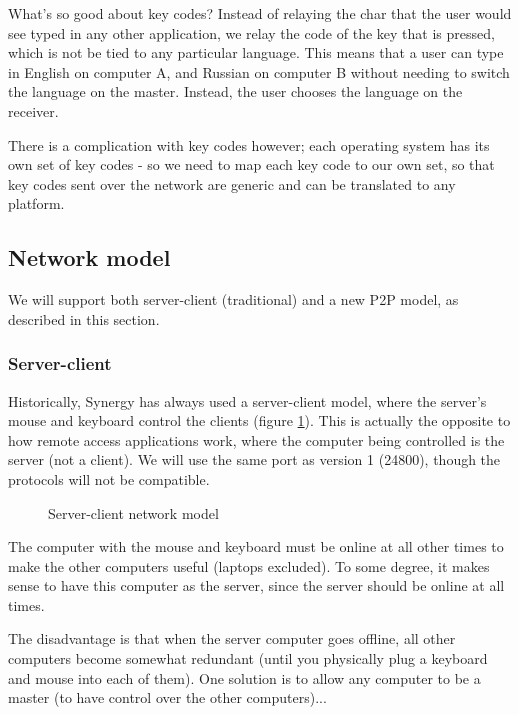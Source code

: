 What's so good about key codes? Instead of relaying the char that the user would
see typed in any other application, we relay the code of the key that is 
pressed, which is not be tied to any particular language. This means that a user
can type in English on computer A, and Russian on computer B without needing to
switch the language on the master. Instead, the user chooses the language on
the receiver.

There is a complication with key codes however; each operating system has its
own set of key codes - so we need to map each key code to our own set, so that
key codes sent over the network are generic and can be translated to any 
platform.

\subsection{Network model}

We will support both server-client (traditional) and a new P2P model, as
described in this section.

\subsubsection{Server-client}

Historically, Synergy has always used a server-client model, where the server's
mouse and keyboard control the clients (figure \ref{fig:serverClient}). This is
actually the opposite to how remote access applications work, where the computer
being controlled is the server (not a client). We will use the same port as 
version 1 (24800), though the protocols will not be compatible.

\begin{figure}[ht!]
  \centering
  
  \caption{Server-client network model}
  \label{fig:serverClient}
\end{figure}

The computer with the mouse and keyboard must be online at all other times to
make the other computers useful (laptops excluded). To some degree, it makes 
sense to have this computer as the server, since the server should be online
at all times.

The disadvantage is that when the server computer goes offline, all other 
computers become somewhat redundant (until you physically plug a keyboard
and mouse into each of them). One solution is to allow any computer to be a 
master (to have control over the other computers)...


